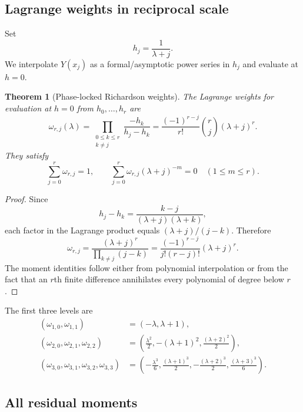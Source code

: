\documentclass[11pt]{article}
\newtheorem{theorem}{Theorem}[section]
\theoremstyle{definition}
\theoremstyle{remark}
\begin{document}
\subsection{Lagrange weights in reciprocal scale}

Set
\begin{equation}
h_j=\frac1{\lambda+j}.
\label{eq:h-nodes}
\end{equation}
We interpolate $Y(x_j)$ as a formal/asymptotic power series in $h_j$ and evaluate at $h=0$.

\begin{theorem}[Phase-locked Richardson weights]
\label{thm:lambert-weights}
The Lagrange weights for evaluation at $h=0$ from $h_0,\ldots,h_r$ are
\begin{equation}
\boxed{
\omega_{r,j}(\lambda)
=\prod_{\substack{0\le k\le r\\k\ne j}}
\frac{-h_k}{h_j-h_k}
=\frac{(-1)^{r-j}}{r!}\binom{r}{j}(\lambda+j)^r.}
\label{eq:omega}
\end{equation}
They satisfy
\begin{equation}
\sum_{j=0}^{r}\omega_{r,j}=1,
\qquad
\sum_{j=0}^{r}\omega_{r,j}(\lambda+j)^{-m}=0
\quad(1\le m\le r).
\label{eq:omega-cancel}
\end{equation}
\end{theorem}

\begin{proof}
Since
\[
h_j-h_k=\frac{k-j}{(\lambda+j)(\lambda+k)},
\]
each factor in the Lagrange product equals $(\lambda+j)/(j-k)$. Therefore
\[
\omega_{r,j}=\frac{(\lambda+j)^r}
{\prod_{k\ne j}(j-k)}
=\frac{(-1)^{r-j}}{j!(r-j)!}(\lambda+j)^r.
\]
The moment identities follow either from polynomial interpolation or from the fact that an $r$th finite difference annihilates every polynomial of degree below $r$.
\end{proof}

The first three levels are
\begin{align}
(\omega_{1,0},\omega_{1,1})
&=(-\lambda,\lambda+1),
\label{eq:omega1}\\
(\omega_{2,0},\omega_{2,1},\omega_{2,2})
&=\left(\frac{\lambda^2}{2},-(\lambda+1)^2,
\frac{(\lambda+2)^2}{2}\right),
\label{eq:omega2}\\
(\omega_{3,0},\omega_{3,1},\omega_{3,2},\omega_{3,3})
&=\left(-\frac{\lambda^3}{6},\frac{(\lambda+1)^3}{2},
-\frac{(\lambda+2)^3}{2},\frac{(\lambda+3)^3}{6}\right).
\label{eq:omega3}
\end{align}

\subsection{All residual moments}
\end{document}
